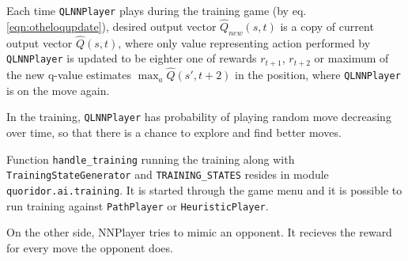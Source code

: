 Each time {\lstinline{QLNNPlayer}} plays during the training game
(by eq. \ref{eqn:otheloqupdate}), desired output vector $\hat{Q}_{new}(s, t)$
is a copy of current output vector $\hat{Q}(s, t)$,
where only value representing action performed by {\lstinline{QLNNPlayer}}
is updated to be eighter one of rewards $r_{t+1}$, $r_{t+2}$ or maximum of
the new q-value estimates $\displaystyle{\max_a}\hat{Q}(s', t{+}2)$
in the position, where {\lstinline{QLNNPlayer}} is on the move again.

In the training, {\lstinline{QLNNPlayer}} has probability of
playing random move decreasing over time, so that there is a chance to explore
and find better moves.

Function {\lstinline{handle_training}} running the training along with
{\lstinline{TrainingStateGenerator}} and {\lstinline{TRAINING_STATES}}
resides in module {\lstinline{quoridor.ai.training}}. It is started through
the game menu and it is possible to run training against
{\lstinline{PathPlayer}} or {\lstinline{HeuristicPlayer}}.

On the other side, NNPlayer tries to mimic an opponent. It recieves the reward
for every move the opponent does.
